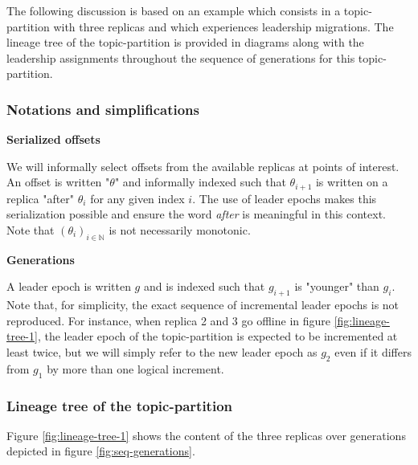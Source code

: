\documentclass{article}
\begin{document}
The following discussion is based on an example which consists in a topic-partition with three replicas and which experiences leadership migrations. The lineage tree of the topic-partition is provided in diagrams along with the leadership assignments throughout the sequence of generations for this topic-partition.

\subsubsection{Notations and simplifications}

\textbf{Serialized offsets}

We will informally select offsets from the available replicas at points of interest. An offset is written "$\theta$" and informally indexed such that $\theta_{i+1}$ is written on a replica "after" $\theta_i$ for any given index $i$. The use of leader epochs makes this serialization possible and ensure the word \textit{after} is meaningful in this context. Note that $(\theta_i)_{i \in \mathbb{N}}$ is not necessarily monotonic. 

\textbf{Generations}

A leader epoch is written $g$ and is indexed such that $g_{i+1}$ is "younger" than $g_i$. Note that, for simplicity, the exact sequence of incremental leader epochs is not reproduced. For instance, when replica 2 and 3 go offline in figure \ref{fig:lineage-tree-1}, the leader epoch of the topic-partition is expected to be incremented at least twice, but we will simply refer to the new leader epoch as $g_2$ even if it differs from $g_1$ by more than one logical increment.

\subsubsection{Lineage tree of the topic-partition}

Figure \ref{fig:lineage-tree-1} shows the content of the three replicas over generations depicted in figure \ref{fig:seq-generations}.
\end{document}
